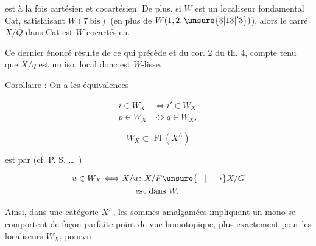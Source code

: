 
est à la fois cartésien et cocartésien. De plus, si $W$ est un localiseur fondamental  Cat, satisfaisant  $W(7\ \mathrm{bis})$ (en plus de $W(1,2,\unsure{3|13|{}'3})$), alors le  carré $X/Q$ dans Cat est $W$-cocartésien.

Ce dernier énoncé résulte de ce qui précède et du cor. 2 du th. 4, compte tenu que $X/q$ est un iso. local donc est $W$-lisse.

\uline{Corollaire} : On a  les équivalences

\[
\begin{aligned}
i\in W_X &\Longleftrightarrow i'\in W_X\\
p\in W_X &\Longleftrightarrow q\in W_X ,
\end{aligned}
\]


\[
W_X\subset\operatorname{Fl}(X^\wedge)
\]

est  par (cf. P. S. \ldots\ )

\[
\begin{aligned}
u\in W_X &\Longleftrightarrow X/u\colon X/F\unsure{-|\longrightarrow}X/G\\
&\hspace{4em}\text{est dans }W.
\end{aligned}
\]

Ainsi, dans une catégorie $X^\wedge$, les sommes amalgamées impliquant un mono se comportent de façon parfaite  point de vue homotopique, plus exactement pour les localiseurs $W_X$, pourvu
